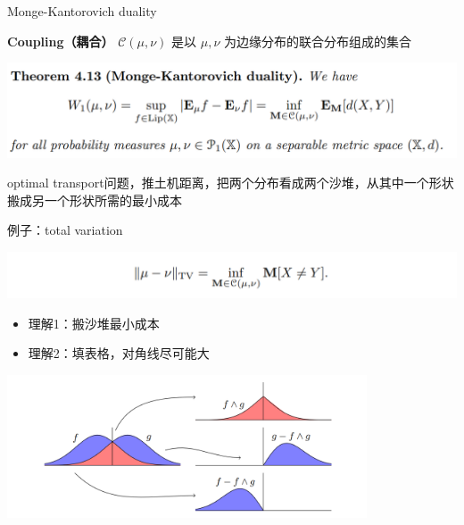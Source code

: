 \documentclass{beamer}
\begin{document}
\begin{frame}{Monge-Kantorovich duality}

\textbf{Coupling（耦合）} $\mathcal{C}(\mu, \nu)$ 是以 $\mu, \nu$ 为边缘分布的联合分布组成的集合

\begin{center}
\includegraphics[width=1.0\textwidth, frame]{figures/4-13-thm.png}
\end{center}

optimal transport问题，推土机距离，把两个分布看成两个沙堆，从其中一个形状搬成另一个形状所需的最小成本

\end{frame}

\begin{frame}{例子：total variation}

\begin{center}
\includegraphics[width=1.0\textwidth, frame]{figures/4-14-eg.png}
\end{center}

\begin{itemize}
    \item 理解1：搬沙堆最小成本
    \item 理解2：填表格，对角线尽可能大
\end{itemize}

\begin{center}
\includegraphics[width=0.8\textwidth, frame]{figures/4-14-fig.png}
\end{center}

\end{frame}
\end{document}

